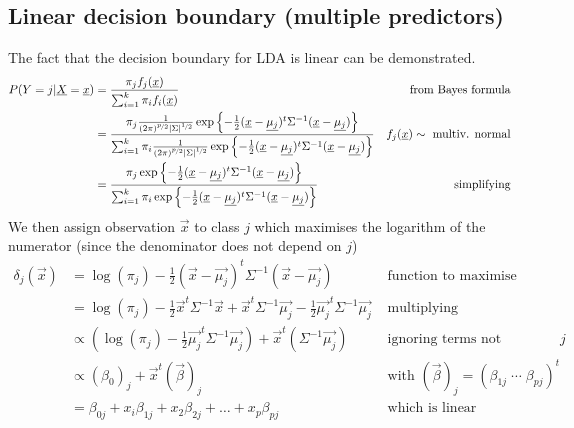     \subsection{Linear decision boundary (multiple predictors)}
      The fact that the decision boundary for LDA is linear can be demonstrated.
      \begin{align*}
      P(Y=j|\vec{X} = \vec{x})
      & = \frac{\pi_jf_j(\vec{x})}{\sum_{i=1}^{k}\pi_if_i(\vec{x})} 
      & \text{ from Bayes formula} \\
      & = \frac
      {\pi_j\frac{1}{(2\pi)^{\nicefrac{p}{2}}|\Sigma|^{\nicefrac{1}{2}}}\exp\left\{-\frac{1}{2}(\vec{x}-\vec{\mu_j})^t \Sigma^{-1} (\vec{x}-\vec{\mu_j})\right\}}
      {\sum_{i=1}^{k}\pi_i\frac{1}{(2\pi)^{\nicefrac{p}{2}}|\Sigma|^{\nicefrac{1}{2}}}\exp\left\{-\frac{1}{2}(\vec{x}-\vec{\mu_j})^t \Sigma^{-1} (\vec{x}-\vec{\mu_j})\right\}}
      & f_j(\vec{x})\sim\text{ multiv. normal}\\
      & = \frac
      {\pi_j\exp\left\{-\frac{1}{2}(\vec{x}-\vec{\mu_j})^t \Sigma^{-1} (\vec{x}-\vec{\mu_j})\right\}}
      {\sum_{i=1}^{k}\pi_i\exp\left\{-\frac{1}{2}(\vec{x}-\vec{\mu_j})^t \Sigma^{-1} (\vec{x}-\vec{\mu_j})\right\}}
      & \text{ simplifying}
      \end{align*}
      We then assign observation $\vec{x}$ to class $j$ which maximises the logarithm of the numerator (since the denominator does not depend on $j$)
      \begin{align*}
      \delta_j(\vec{x})
      & = \log(\pi_j) -\frac{1}{2}(\vec{x}-\vec{\mu_j})^t \Sigma^{-1} (\vec{x}-\vec{\mu_j})
      & \text{ function to maximise} \\
      & = \log(\pi_j) -\frac{1}{2}\vec{x}^t\Sigma^{-1}\vec{x} + \vec{x}^t \Sigma^{-1}\vec{\mu_j} - \frac{1}{2}\vec{\mu_j}^t\Sigma^{-1}\vec{\mu_j}
      & \text{ multiplying} \\
      & \propto \left(\log(\pi_j) - \frac{1}{2}\vec{\mu_j}^t\Sigma^{-1}\vec{\mu_j}\right) + \vec{x}^t \left(\Sigma^{-1}\vec{\mu_j}\right)
      & \text{ ignoring terms not depending on } j\\
      & \propto (\beta_0)_j + \vec{x}^t (\vec{\beta})_j
      & \text{ with } (\vec{\beta})_j = (\beta_{1j} \;\cdots\; \beta_{pj})^t \\
      & = \beta_{0j} + x_i\beta_{1j} + x_2\beta_{2j} + \dots + x_p\beta_{pj}
      & \text{ which is linear}
      \end{align*}
      
